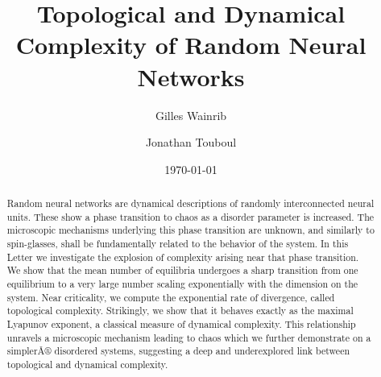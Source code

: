 

\usepackage{amsmath,amssymb,amsthm}

\setlength{\textheight}{9.5in}
\usepackage{hyperref}
\usepackage{amsthm}
\usepackage{graphicx}
\usepackage{subfigure}
\usepackage{color,bbm}
\usepackage[normalem]{ulem}


\graphicspath{{./Figures/}}

 
  

 



\title{Topological and Dynamical Complexity of Random Neural Networks}

\author{Gilles Wainrib}
\author{Jonathan Touboul}

\date{\today}
\begin{abstract}
	Random neural networks are dynamical descriptions of randomly interconnected neural units. These show a phase transition to chaos as a disorder parameter is increased. The microscopic mechanisms underlying this phase transition are unknown, and similarly to spin-glasses, shall be fundamentally related to the  behavior of the system. In this Letter we investigate the explosion of complexity arising near that phase transition. We show that the mean number of equilibria undergoes a sharp transition from one equilibrium to a very large number scaling exponentially with the dimension on the system. Near criticality, we compute the exponential rate of divergence, called topological complexity. Strikingly, we show that it behaves exactly as the maximal Lyapunov exponent, a classical measure of dynamical complexity. This relationship unravels a microscopic mechanism leading to chaos which we further demonstrate on a simplerÂ® disordered systems, suggesting a deep and underexplored link between topological and dynamical complexity. 
\end{abstract}

\maketitle

